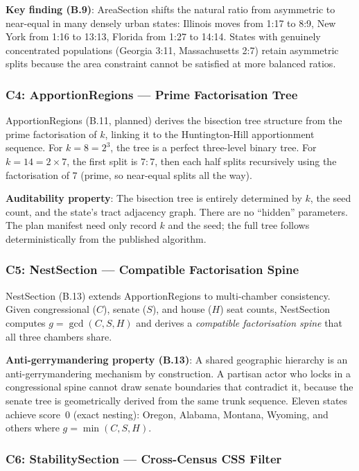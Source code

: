 \textbf{Key finding (B.9)}: AreaSection shifts the natural ratio from asymmetric
to near-equal in many densely urban states: Illinois moves from 1:17 to 8:9,
New York from 1:16 to 13:13, Florida from 1:27 to 14:14.
States with genuinely concentrated populations (Georgia 3:11, Massachusetts 2:7)
retain asymmetric splits because the area constraint cannot be satisfied at
more balanced ratios.

\subsubsection*{C4: ApportionRegions --- Prime Factorisation Tree}

ApportionRegions (B.11, planned) derives the bisection tree structure from the
prime factorisation of $k$, linking it to the Huntington-Hill apportionment
sequence.
For $k = 8 = 2^3$, the tree is a perfect three-level binary tree.
For $k = 14 = 2 \times 7$, the first split is $7:7$, then each half splits
recursively using the factorisation of 7 (prime, so near-equal splits all the
way).

\textbf{Auditability property}: The bisection tree is entirely determined by
$k$, the seed count, and the state's tract adjacency graph.
There are no ``hidden'' parameters.
The plan manifest need only record $k$ and the seed; the full tree follows
deterministically from the published algorithm.

\subsubsection*{C5: NestSection --- Compatible Factorisation Spine}

NestSection (B.13) extends ApportionRegions to multi-chamber consistency.
Given congressional ($C$), senate ($S$), and house ($H$) seat counts,
NestSection computes $g = \gcd(C, S, H)$ and derives a \emph{compatible
factorisation spine} that all three chambers share.

\textbf{Anti-gerrymandering property (B.13)}: A shared geographic hierarchy
is an anti-gerrymandering mechanism by construction.
A partisan actor who locks in a congressional spine cannot draw senate boundaries
that contradict it, because the senate tree is geometrically derived from the
same trunk sequence.
Eleven states achieve score~0 (exact nesting): Oregon, Alabama, Montana, Wyoming,
and others where $g = \min(C, S, H)$.

\subsubsection*{C6: StabilitySection --- Cross-Census CSS Filter}


